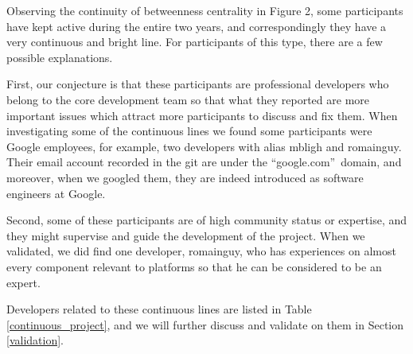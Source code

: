 \documentclass[conference]{IEEEtran}
\begin{document}
Observing the continuity of betweenness centrality in Figure 2, some
participants have kept active during the entire two years, and
correspondingly they have a very continuous and bright line. For
participants of this type, there are a few possible explanations. 

First, our conjecture is that these participants are professional developers who
belong to the core development team so that what they reported are
more important issues which attract more participants to discuss and fix
them. 
When investigating some of the continuous lines we found some
participants were Google employees, for example, two developers with alias mbligh and romainguy.
Their email account recorded in the git are under the \textquotedblleft google.com\textquotedblright \ domain, and moreover, when we googled them, they are indeed introduced as software engineers at Google. 

Second, some of these participants are of high community status or
expertise, and they might
supervise and guide the development of the 
project. When we validated, we did find one developer, romainguy, who has experiences on almost every component relevant to platforms so that he can be considered to be an expert.

Developers related to these continuous lines are listed in Table \ref{continuous_project}, and we will further discuss and validate on them in Section \ref{validation}.
\end{document}
